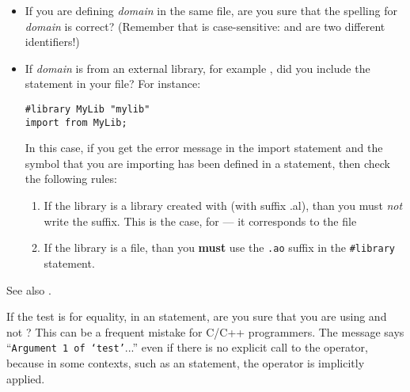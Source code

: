 \begin{itemize}

\item If you are defining {\it domain} in the same file, are you sure that the
spelling for {\it domain} is correct? (Remember that \asharp{} is 
case-sensitive:  and  are two different
identifiers!)

\item If {\it domain} is from an external library, for example 
, did you
include the  statement in your file? For instance:

{\small
\begin{verbatim}
#library MyLib "mylib"
import from MyLib;
\end{verbatim}
}

In this case, if you get the error message in the import statement and the
symbol that you are importing has been defined in a 
statement, then check the following rules:
\begin{enumerate}
\item If the library is a library created with  (with suffix .al), than
you must {\em not} write the suffix. This is the case,  for  
--- it corresponds to the file 
\item If the library is a  file, than you {\bf must} use the
\verb".ao" suffix in the \verb+#library+ statement.
\end{enumerate}
\end{itemize}
See also .


If the test is for equality, in an  statement, are you sure that you
are using \ttin{=} and not \ttin{==}? This can be a frequent mistake for C/C++
programmers.  The message says ``{\tt Argument 1 of `test'}...'' even if
there is no explicit call to the  operator, because in some
contexts, such as an  statement, the  operator
is implicitly applied.


